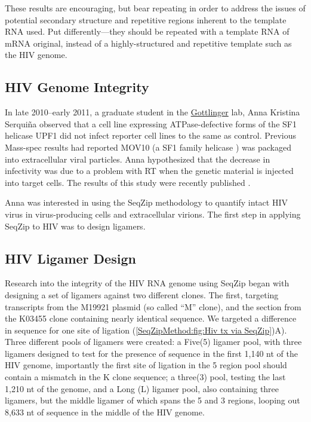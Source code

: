     These results are encouraging, but bear repeating in order to address the issues of potential secondary structure and repetitive regions inherent to the template RNA used. Put differently---they should be repeated with a template RNA of mRNA original, instead of a highly-structured and repetitive template such as the HIV genome.

  \subsection{HIV Genome Integrity}
    \label{SeqZipMethod:subsec: Why use SeqZip to look at HIV genomes}

    In late 2010--early 2011, a graduate student in the \href{http://profiles.umassmed.edu/profiles/display/133484}{Gottlinger} lab, Anna Kristina Serquiña observed that a cell line expressing ATPase-defective forms of the SF1 helicase UPF1 \citep{Bhattacharya2000} did not infect reporter cell lines to the same as control. Previous Mass-spec results had reported MOV10 (a SF1 family helicase \citep{Gregersen2014}) was packaged into extracellular viral particles. Anna hypothesized that the decrease in infectivity was due to a problem with RT when the genetic material is injected into target cells. The results of this study were recently published \citep{Serquina2013}.

    Anna was interested in using the SeqZip methodology to quantify intact HIV virus in virus-producing cells and extracellular virions. The first step in applying SeqZip to HIV was to design ligamers.

	\subsection{HIV Ligamer Design}
    \label{SeqZipMethod:subsec: Design of HIV ligamers}

	  Research into the integrity of the HIV RNA genome using SeqZip began with designing a set of ligamers against two different clones. The first, targeting transcripts from the M19921 plasmid (so called ``M'' clone), and the section from the K03455 clone containing nearly identical sequence. We targeted a difference in sequence for one site of ligation (\ref{SeqZipMethod:fig:Hiv tx via SeqZip})A). Three different pools of ligamers were created: a Five(5) ligamer pool, with three ligamers designed to test for the presence of sequence in the first 1,140 nt of the HIV genome, importantly the first site of ligation in the 5 region pool should contain a mismatch in the K clone sequence; a three(3) pool, testing the last 1,210 nt of the genome, and a Long (L) ligamer pool, also containing three ligamers, but the middle ligamer of which spans the 5 and 3 regions, looping out 8,633 nt of sequence in the middle of the HIV genome. 

